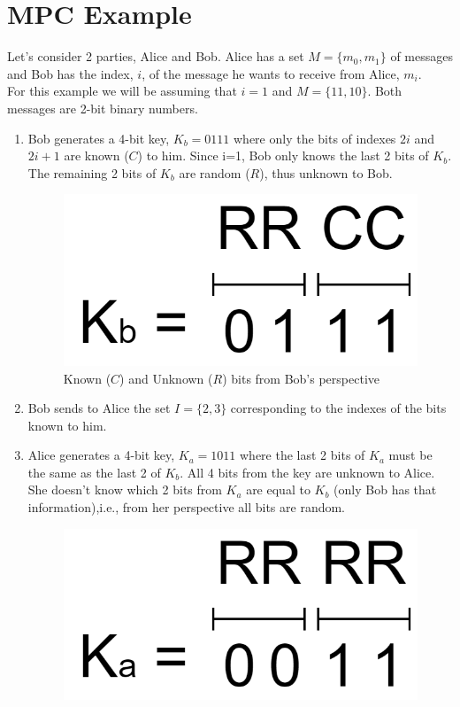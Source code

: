 \section{MPC Example}
Let's consider 2 parties, Alice and Bob. Alice has a set $M = \{m_0,m_1\}$ of messages and Bob has the index, $i$, of the message he wants to receive from Alice, $m_i$.\\
For this example we will be assuming that $i=1$ and $M = \{11,10\}$. Both messages are 2-bit binary numbers.
\begin{enumerate}
\item Bob generates a 4-bit key, $K_b=0111$ where only the bits of indexes $2i$ and $2i+1$ are known ($C$) to him. Since i=1, Bob only knows the last 2 bits of $K_b$. The remaining 2 bits of $K_b$ are random ($R$), thus unknown to Bob.
\renewcommand{\figurename}{Figure}
\begin{figure}[H]
\centering
\includegraphics[width=.25\linewidth]{./figures/mpc/mpc_bob_key}
\caption{Known ($C$) and Unknown ($R$) bits from Bob's perspective }
\label{fig:knownbob}
\end{figure}
\item Bob sends to Alice the set $I = \{2,3\}$ corresponding to the indexes of the bits known to him.
\item Alice generates a 4-bit key, $K_a=1011$ where the last 2 bits of $K_a$ must be the same as the last 2 of $K_b$. All 4 bits from the key
are unknown to Alice. She doesn't know which 2 bits from $K_a$ are equal to $K_b$ (only Bob has that information),i.e., from her perspective
all bits are random.
\renewcommand{\figurename}{Figure}
\begin{figure}[H]
\centering
\includegraphics[width=.25\linewidth]{./figures/mpc/mpc_alice_key}

\end{figure}
\end{enumerate}
